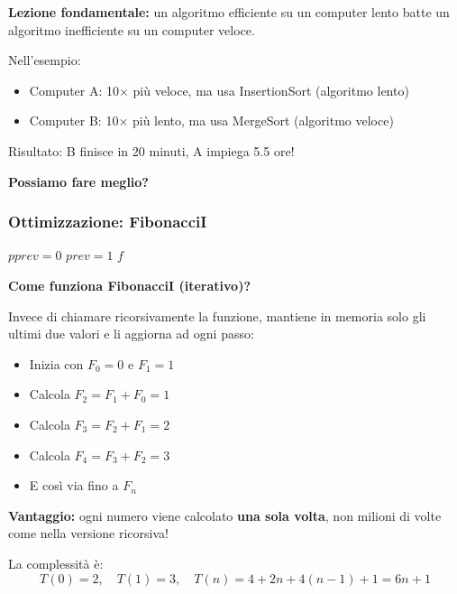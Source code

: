 \begin{hardnote}
	\textbf{Lezione fondamentale:} un algoritmo efficiente su un computer lento batte un algoritmo inefficiente su un computer veloce.
	
	Nell'esempio:
	\begin{itemize}
		\item Computer A: 10× più veloce, ma usa InsertionSort (algoritmo lento)
		\item Computer B: 10× più lento, ma usa MergeSort (algoritmo veloce)
	\end{itemize}
	Risultato: B finisce in 20 minuti, A impiega 5.5 ore!
\end{hardnote}

\textbf{Possiamo fare meglio?}

\subsubsection*{Ottimizzazione: FibonacciI }
\begin{algorithm}[H]
	\caption{FibonacciI}
	$\mathit{pprev} = 0$\;
	$\mathit{prev} = 1$\;
	\Return $f$\;
\end{algorithm}

\begin{softnote}
	\textbf{Come funziona FibonacciI (iterativo)?}
	
	Invece di chiamare ricorsivamente la funzione, mantiene in memoria solo gli ultimi due valori e li aggiorna ad ogni passo:
	
	\begin{itemize}
		\item Inizia con $F_0=0$ e $F_1=1$
		\item Calcola $F_2 = F_1 + F_0 = 1$
		\item Calcola $F_3 = F_2 + F_1 = 2$
		\item Calcola $F_4 = F_3 + F_2 = 3$
		\item E così via fino a $F_n$
	\end{itemize}
	
	\textbf{Vantaggio:} ogni numero viene calcolato \textbf{una sola volta}, non milioni di volte come nella versione ricorsiva!
\end{softnote}

La complessità è:
\[
T(0) = 2, \quad T(1) = 3, \quad T(n) = 4 + 2n + 4(n-1) + 1 = 6n + 1
\]


